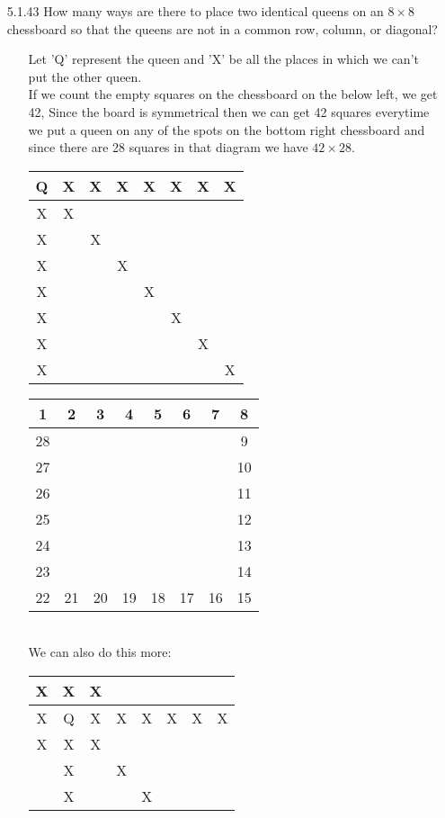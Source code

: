 \documentclass[12pt]{article}
\begin{document}
\begin{enumerate}
\item[5.1.43] How many ways are there to place two identical queens on an $8 \times 8$ chessboard so that the queens are not in a common row, column, or diagonal?
\begin{enumerate}
\item[] Let 'Q' represent the queen and 'X' be all the places in which we can't put the other queen. \\
If we count the empty squares on the chessboard on the below left, we get 42, Since the board is symmetrical
then we can get 42 squares everytime we put a queen on any of the spots on the bottom right chessboard and since
there are 28 squares in that diagram we have $42 \times 28$.\\
\begin{tabular}{|c|c|c|c|c|c|c|c|}
\hline
 Q&X&X&X&X&X&X&X \\
 \hline
 X&X& && && & \\
 \hline
X&&X && && & \\
 \hline
X&& &X& && & \\
 \hline
X&& &&X && & \\
 \hline
X&& && &X& & \\
 \hline
X&& && &&X & \\
 \hline
X&& && && &X \\
\hline
\end{tabular} \begin{tabular}{|c|c|c|c|c|c|c|c|}
\hline
 1&2&3&4&5&6&7&8 \\
 \hline
28&& && && &9 \\
 \hline
27&&&& && &10 \\
 \hline
26&&&&&& &11 \\
 \hline
25&& && && &12 \\
 \hline
24&& && && &13 \\
 \hline
23&& && && &14 \\
 \hline
22&21&20&19&18&17&16&15 \\
\hline
\end{tabular} \\
We can also do this more: \\
\begin{tabular}{|c|c|c|c|c|c|c|c|}
\hline
X&X&X&&&&& \\
 \hline
X&Q&X&X&X&X&X&X \\
 \hline
X&X&X&& && & \\
 \hline
&X&&X&&& & \\
 \hline
&X& &&X && & \\
 \hline

\end{tabular}
\end{enumerate}
\end{enumerate}
\end{document}
